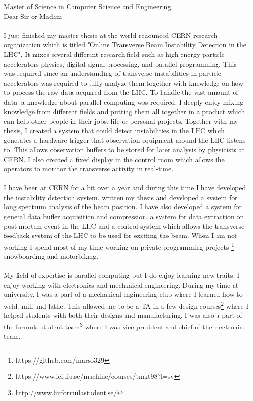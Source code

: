 \documentclass[left=2.5cm,top=2cm,right=2.5cm,bottom=2.5cm]{cv-style}
\begin{document}
       {Master of Science in Computer Science and Engineering}        %
\vspace{10mm}
\\
Dear Sir or Madam
\\
\\
I just finished my master thesis at the world renounced CERN research organization which is titled "Online Transverse Beam Instability Detection in the LHC". It mixes several different research field such as high-energy particle accelerators physics, digital signal processing, and parallel programming. This was required since an understanding of transverse instabilities in particle accelerators was required to fully analyze them together with knowledge on how to process the raw data acquired from the LHC. To handle the vast amount of data, a knowledge about parallel computing was required. I deeply enjoy mixing knowledge from different fields and putting them all together in a product which can help other people in their jobs, life or personal projects. Together with my thesis, I created a system that could detect instabilities in the LHC which generates a hardware trigger that observation equipment around the LHC listens to. This allows observation buffers to be stored for later analysis by physicists at CERN. I also created a fixed display in the control room which allows the operators to monitor the transverse activity in real-time.
\\
\\
I have been at CERN for a bit over a year and during this time I have developed the instability detection system, written my thesis and developed a system for long spectrum analysis of the beam position. I have also developed a system for general data buffer acquisition and compression, a system for data extraction on post-mortem event in the LHC and a control system which allows the transverse feedback system of the LHC to be used for exciting the beam. When I am not working I spend most of my time working on private programming projects \footnote{https://github.com/marso329}, snowboarding and motorbiking. 
\\
\\
My field of expertise is parallel computing but I do enjoy learning new traits. I enjoy working with electronics and mechanical engineering. During my time at university, I was a part of a mechanical engineering club where I learned how to weld, mill and lathe. This allowed me to be a TA in a few design courses\footnote{https://www.iei.liu.se/machine/courses/tmkt98?l=sv} where I helped students with both their designs and manufacturing. I was also a part of the formula student team\footnote{http://www.liuformulastudent.se/} where I was vice president and chief of the electronics team.
\end{document}
